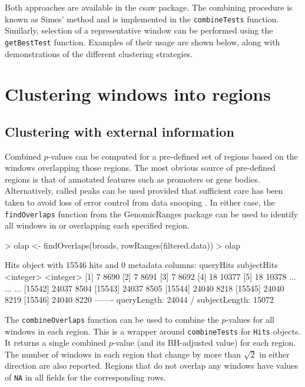 \documentclass[12pt]{report}
\renewenvironment{Schunk}{\vspace{0pt}}{\vspace{0pt}}
\newcommand{\pkgname}{csaw}
\newcommand{\code}[1]{{\small\texttt{#1}}}
\newcommand{\granges}{GenomicRanges}
\begin{document}
Both approaches are available in the \pkgname{} package.
The combining procedure is known as Simes' method and is implemented in the \code{combineTests} function.
Similarly, selection of a representative window can be performed using the \code{getBestTest} function.
Examples of their usage are shown below, along with demonstrations of the different clustering strategies.

\section{Clustering windows into regions}

\subsection{Clustering with external information}
Combined $p$-values can be computed for a pre-defined set of regions based on the windows overlapping those regions. 
The most obvious source of pre-defined regions is that of annotated features such as promoters or gene bodies.
Alternatively, called peaks can be used provided that sufficient care has been taken to avoid loss of error control from data snooping \citep{lun2014}.
In either case, the \code{findOverlaps} function from the \granges{} package can be used to identify all windows in or overlapping each specified region. 

\begin{Schunk}
\begin{Sinput}
> olap <- findOverlaps(broads, rowRanges(filtered.data))
> olap
\end{Sinput}
\begin{Soutput}
Hits object with 15546 hits and 0 metadata columns:
          queryHits subjectHits
          <integer>   <integer>
      [1]         7        8690
      [2]         7        8691
      [3]         7        8692
      [4]        18       10377
      [5]        18       10378
      ...       ...         ...
  [15542]     24037        8504
  [15543]     24037        8505
  [15544]     24040        8218
  [15545]     24040        8219
  [15546]     24040        8220
  -------
  queryLength: 24044 / subjectLength: 15072
\end{Soutput}
\end{Schunk}

The \code{combineOverlaps} function can be used to combine the $p$-values for all windows in each region. 
This is a wrapper around \code{combineTests} for \code{Hits} objects.
It returns a single combined $p$-value (and its BH-adjusted value) for each region. 
The number of windows in each region that change by more than $\sqrt{2}$ in either direction are also reported.
Regions that do not overlap any windows have values of \code{NA} in all fields for the corresponding rows.
\end{document}
